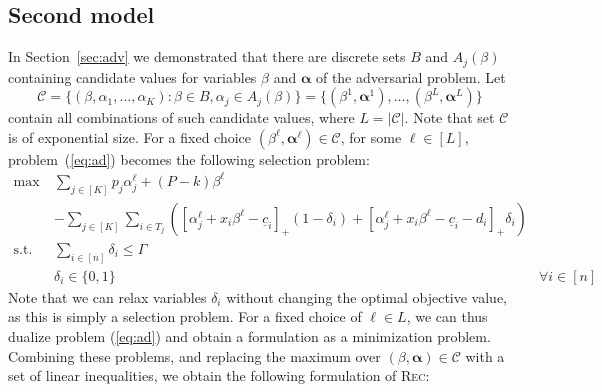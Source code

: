 \documentclass[a4paper,11pt,abstracton]{scrartcl}
\theoremstyle{definition}
\theoremstyle{remark}
\begin{document}
\subsection{Second model}
\label{sec:second}

In Section~\ref{sec:adv} we demonstrated that there are discrete sets $B$ and $A_j(\beta)$ containing candidate values for variables $\beta$ and $\pmb{\alpha}$ of the adversarial problem. Let
\[ \mathcal{C} = \{ (\beta,\alpha_1,\ldots,\alpha_K) : \beta \in B, \alpha_j \in A_j(\beta) \} =  \{ (\beta^1,\pmb{\alpha}^1), \ldots, (\beta^{L},\pmb{\alpha}^{L}) \} \]
contain all combinations of such candidate values, where $L = |\mathcal{C}|$. Note that set $\mathcal{C}$ is of exponential size. For a fixed choice $(\beta^{\ell},\pmb{\alpha}^{\ell})\in \mathcal{C}$, for some $\ell \in [L]$, problem~(\ref{eq:ad}) becomes the following selection problem:
\begin{subequations}
\label{eq:ads}  
\begin{align}
\max\ & \sum_{j\in[K]} p_j \alpha^{\ell}_j + (P-k)\beta^{\ell} \nonumber \\
& - \sum_{j\in[K]} \sum_{i\in T_j} \left( \left[ \alpha_j^{\ell} + x_i\beta^{\ell} - \underline{c}_i \right]_+ (1-\delta_i) + \left[ \alpha_j^{\ell} + x_i\beta^{\ell} - \underline{c}_i - d_i \right]_+ \delta_i \right)  \label{ads-2}\\
\text{s.t. } & \sum_{i\in[n]} \delta_i \le \Gamma \label{ads-3}\\
& \delta_i \in\{0,1\} & \forall i\in[n] \label{ads-4}
\end{align}
\end{subequations}
Note that we can relax variables $\delta_i$ without changing the optimal objective value, as this is simply a selection problem. For a fixed choice of $\ell \in L$, we can thus dualize problem (\ref{eq:ad}) and obtain a formulation as a minimization problem. Combining these problems, and replacing the maximum over $(\beta, \pmb \alpha) \in \mathcal{C}$ with a set of linear inequalities, we obtain the following formulation of \textsc{Rec}:
\end{document}
